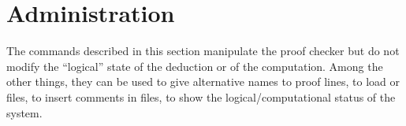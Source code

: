 \section{Administration}
\label{sec-adm}

The commands described in this section manipulate the proof checker but do
not modify  the ``logical'' state of the deduction or of the computation.
Among the other things, they can be used to give alternative names to proof lines,
to load {\HG} or {\GF} files, to insert comments in {\GF} files, to show the
logical/computational status of the system.
